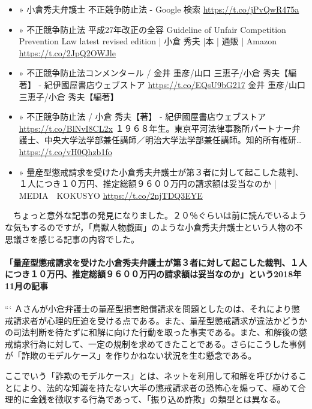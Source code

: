\documentclass[]{ltjarticle}
\let\oldparagraph\paragraph
\renewcommand{\paragraph}[1]{\oldparagraph{#1}\mbox{}}
\begin{document}
\begin{itemize}
\item » 小倉秀夫弁護士 不正競争防止法 - Google 検索 \url{https://t.co/jPvQwR475a}

\item » 不正競争防止法 平成27年改正の全容 Guideline of Unfair Competition Prevention Law latest revised edition | 小倉 秀夫 |本 | 通販 | Amazon \url{https://t.co/2JpQ2OWJle}

\item » 不正競争防止法コンメンタ－ル / 金井 重彦/山口 三恵子/小倉 秀夫【編著】 - 紀伊國屋書店ウェブストア \url{https://t.co/EQsU9bG217} 金井 重彦/山口 三恵子/小倉 秀夫【編著】

\item » 不正競争防止法 / 小倉 秀夫【著】 - 紀伊國屋書店ウェブストア \url{https://t.co/BlNvI8CL2x} １９６８年生。東京平河法律事務所パートナー弁護士、中央大学法学部兼任講師／明治大学法学部兼任講師。知的所有権研… \url{https://t.co/vH0Qhzb1fo}

\item » 量産型懲戒請求を受けた小倉秀夫弁護士が第３者に対して起こした裁判、１人につき１０万円、推定総額９６００万円の請求額は妥当なのか | MEDIA　KOKUSYO \url{https://t.co/2njTDQ3EYE}
\end{itemize}

　ちょっと意外な記事の発見になりました。２０％ぐらいは前に読んでいるような気もするのですが，「鳥獣人物戯画」のような小倉秀夫弁護士という人物の不思議さを感じる記事の内容でした。

\paragraph{「量産型懲戒請求を受けた小倉秀夫弁護士が第３者に対して起こした裁判、１人につき１０万円、推定総額９６００万円の請求額は妥当なのか」という2018年11月の記事}
\label{sec:orge68c2c9}

```
Ａさんが小倉弁護士の量産型損害賠償請求を問題としたのは、それにより懲戒請求者が心理的圧迫を受ける点である。また、量産型懲戒請求が違法かどうかの司法判断を待たずに和解に向けた行動を取った事実である。また、和解後の懲戒請求行為に対して、一定の規制を求めてきたことである。さらにこうした事例が「詐欺のモデルケース」を作りかねない状況を生む懸念である。

ここでいう「詐欺のモデルケース」とは、ネットを利用して和解を呼びかけることにより、法的な知識を持たない大半の懲戒請求者の恐怖心を煽って、極めて合理的に金銭を徴収する行為であって、「振り込め詐欺」の類型とは異なる。
\end{document}
